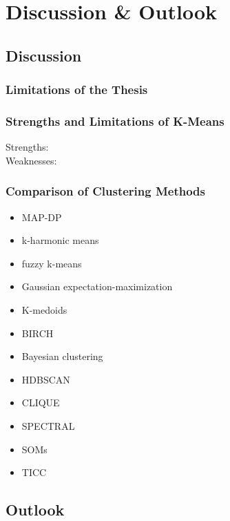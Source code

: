 \chapter{Discussion \& Outlook}
\label{cha:discussion}




\section{Discussion}
\subsection{Limitations of the Thesis}

\subsection{Strengths and Limitations of K-Means}
\begin{description}
    \item[Strengths:]
    \item[Weaknesses:]  
\end{description}
\subsection{Comparison of Clustering Methods}
\begin{itemize}
    \item MAP-DP
    \item k-harmonic means
    \item fuzzy k-means
    \item Gaussian expectation-maximization
    \item K-medoids
    \item BIRCH
    \item Bayesian clustering
    \item HDBSCAN
    \item CLIQUE
    \item SPECTRAL
    \item SOMs
    \item TICC
\end{itemize}

\section{Outlook}
